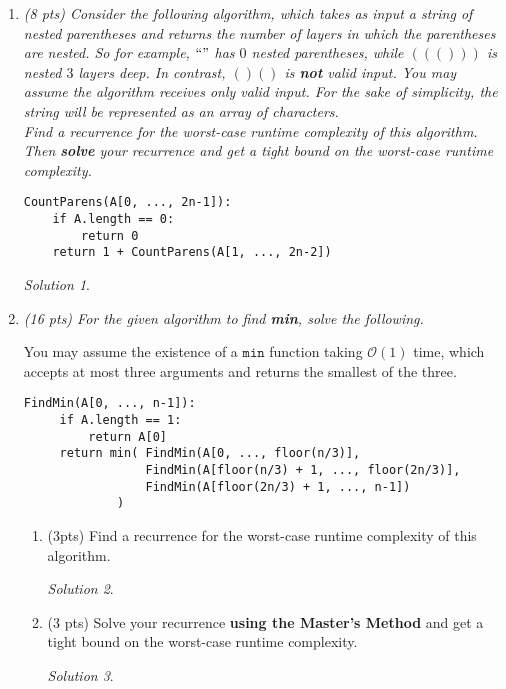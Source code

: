 \documentclass[12pt]{article}
\theoremstyle{remark}
\newtheorem*{solution}{Solution}
\newcommand{\makenonemptybox}[2]{%
\item[]
\fbox{%
\parbox[c][#1][t]{\dimexpr\linewidth-2\fboxsep-2\fboxrule}{
  \hrule width \hsize height 0pt
  #2
 }%
}%
\par\vspace{\ht\strutbox}
}
\begin{document}
\begin{enumerate}

\pagebreak
\item{\itshape (8 pts) Consider the following algorithm, which takes as input a string of nested parentheses and returns the number of layers in which the parentheses are nested. So for example, $``"$ has $0$ nested parentheses, while $((()))$ is nested $3$ layers deep. In contrast, $()()$ is \textbf{not} valid input. You may assume the algorithm receives only valid input. For the sake of simplicity, the string will be represented as an array of characters. \\

\noindent Find a recurrence for the worst-case runtime complexity of this algorithm. Then \textbf{solve} your recurrence and get a tight bound on the worst-case runtime complexity.}
\begin{verbatim}
CountParens(A[0, ..., 2n-1]):
    if A.length == 0:
        return 0
    return 1 + CountParens(A[1, ..., 2n-2])
\end{verbatim}
\begin{solution}
\end{solution}

\pagebreak
\item{\itshape (16 pts) For the given algorithm to find \textbf{min}, solve the following.

You may assume the existence of a $\texttt{min}$ function taking $\mathcal{O}(1)$ time, which accepts at most three arguments and returns the smallest of the three.}
\begin{verbatim}
FindMin(A[0, ..., n-1]):
     if A.length == 1:
         return A[0]
     return min( FindMin(A[0, ..., floor(n/3)], 
                 FindMin(A[floor(n/3) + 1, ..., floor(2n/3)],
                 FindMin(A[floor(2n/3) + 1, ..., n-1])
             )
\end{verbatim}
\begin{enumerate}[label=(\alph*)]
\item (3pts) Find a recurrence for the worst-case runtime complexity of this algorithm.
\begin{solution}
\end{solution}
\pagebreak

\item (3 pts) Solve your recurrence \textbf{using the Master's Method} and get a tight bound on the worst-case runtime complexity.
\begin{solution}
\end{solution}
\pagebreak


\end{enumerate}
\end{enumerate}
\end{document}
